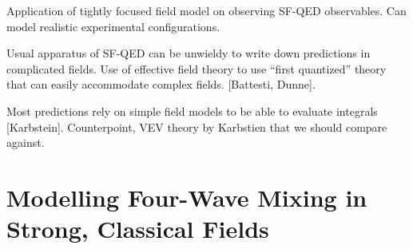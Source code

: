 \documentclass[11pt,SymmetricalJury]{inrsthesis/inrsthesis}
\begin{document}
Application of tightly focused field model on observing SF-QED observables.
Can model realistic experimental configurations.


Usual apparatus of SF-QED can be unwieldy to write down predictions in
complicated fields. Use of effective field theory to use ``first quantized''
theory that can easily accommodate complex fields. [Battesti, Dunne].

Most predictions rely on simple field models to be able to evaluate integrals [Karbstein].
Counterpoint, VEV theory by Karbstien that we should compare against.


\section{Modelling Four-Wave Mixing in Strong, Classical Fields}
\end{document}
